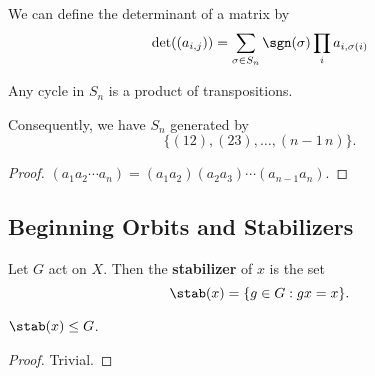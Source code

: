 \begin{ex}
We can define the determinant of a matrix by
\[ \det((a_{i,j})) = \sum_{\sigma \in S_n} \sgn(\sigma) \prod_{i}
a_{i,\sigma(i)} \]
\end{ex}

\begin{prop}
Any cycle in $S_n$ is a product of transpositions.

Consequently, we have $S_n$ generated by
\[ \lbrace (12), (23), \dots, (n - 1\,n) \rbrace. \]
\end{prop}

\begin{proof}
$(a_1 a_2 \cdots a_n) = (a_1 a_2)(a_2 a_3) \cdots (a_{n - 1}a_n)$.
\end{proof}

\subsection{Beginning Orbits and Stabilizers}
\begin{df}
Let $G$ act on $X$. Then the \textbf{stabilizer} of $x$ is the set
\[ \stab(x) = \lbrace g \in G : gx = x \rbrace. \]
\end{df}

\begin{prop}
$\stab(x) \leq G$.
\end{prop}

\begin{proof}
Trivial.
\end{proof}

